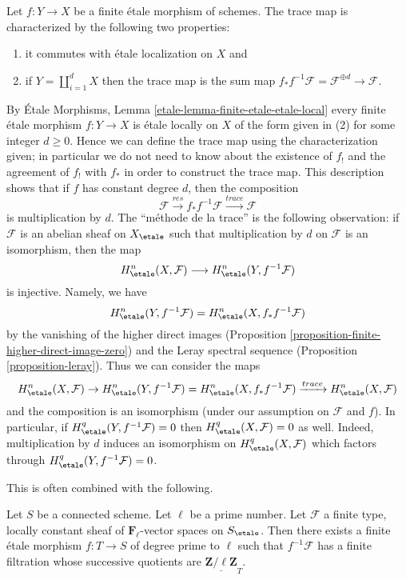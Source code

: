 \noindent
Let $f : Y \to X$ be a finite \'etale morphism of schemes. The trace map is
characterized by the following two properties:
\begin{enumerate}
\item it commutes with \'etale localization on $X$ and
\item if $Y = \coprod_{i = 1}^d X$ then the trace map is
the sum map $f_*f^{-1} \mathcal{F} = \mathcal{F}^{\oplus d} \to \mathcal{F}$.
\end{enumerate}
By \'Etale Morphisms, Lemma \ref{etale-lemma-finite-etale-etale-local}
every finite \'etale morphism $f : Y \to X$ is \'etale locally on $X$
of the form given in (2) for some integer $d \geq 0$. Hence we
can define the trace map using the characterization given; in particular
we do not need to know about the existence of $f_!$ and the agreement
of $f_!$ with $f_*$ in order to construct the trace map.
This description shows that if $f$ has constant degree $d$, then
the composition
$$
\mathcal{F} \xrightarrow{res}
f_* f^{-1} \mathcal{F} \xrightarrow{trace}
\mathcal{F}
$$
is multiplication by $d$. The ``m\'ethode de la trace''
is the following observation: if $\mathcal{F}$
is an abelian sheaf on $X_\etale$ such that multiplication by $d$
on $\mathcal{F}$ is an isomorphism, then the map
$$
H^n_\etale(X, \mathcal{F}) \longrightarrow H^n_\etale(Y, f^{-1}\mathcal{F})
$$
is injective. Namely, we have
$$
H^n_\etale(Y, f^{-1}\mathcal{F}) = H^n_\etale(X, f_*f^{-1}\mathcal{F})
$$
by the vanishing of the higher direct images
(Proposition \ref{proposition-finite-higher-direct-image-zero})
and the Leray spectral sequence
(Proposition \ref{proposition-leray}).
Thus we can consider the maps
$$
H^n_\etale(X, \mathcal{F}) \to
H^n_\etale(Y, f^{-1}\mathcal{F})= H^n_\etale(X, f_*f^{-1}\mathcal{F})
\xrightarrow{trace}
H^n_\etale(X, \mathcal{F})
$$
and the composition is an isomorphism (under our assumption on $\mathcal{F}$
and $f$). In particular, if
$H_\etale^q(Y, f^{-1}\mathcal{F}) = 0$ then
$H_\etale^q(X, \mathcal{F}) = 0$ as well.
Indeed, multiplication by $d$ induces an
isomorphism on $H_\etale^q(X, \mathcal{F})$ which factors through
$H_\etale^q(Y, f^{-1}\mathcal{F})= 0$.

\medskip\noindent
This is often combined with the following.

\begin{lemma}
\label{lemma-pullback-filtered}
Let $S$ be a connected scheme. Let $\ell$ be a prime number. Let
$\mathcal{F}$ a finite type, locally constant sheaf of
$\mathbf{F}_\ell$-vector spaces on $S_\etale$.
Then there exists a finite \'etale morphism
$f : T \to S$ of degree prime to $\ell$ such that $f^{-1}\mathcal{F}$
has a finite filtration whose successive quotients are
$\underline{\mathbf{Z}/\ell\mathbf{Z}}_T$.
\end{lemma}

